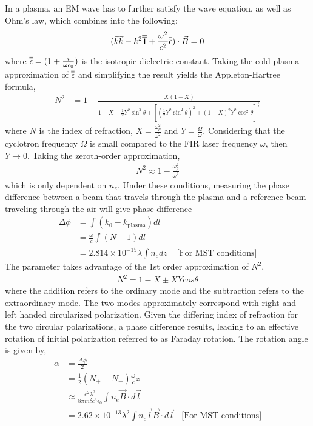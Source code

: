 In a plasma, an EM wave has to further satisfy the wave equation, as well as Ohm's law, which combines into the following:
\begin{align}
    (\vec{k}\vec{k} - k^2\overline{\overline{\textbf{1}}} + \frac{\omega^2}{c^2}\overline{\overline{\epsilon}})\cdot\vec{B} = 0
\end{align}
where $\overline{\overline{\epsilon}} = (1+\frac{i}{\omega\epsilon_0})$ is the isotropic dielectric constant. Taking the cold plasma approximation of $\overline{\overline{\epsilon}}$ and simplifying the result yields the Appleton-Hartree formula\cite{hutchinson_2002},
\begin{align}
    N^2 &= 1 - \frac{X(1-X)}{1-X-\frac{1}{2}Y^2 \sin^2\theta\pm [(\frac{1}{2}Y^2\sin^2\theta)^2 + (1-X)^2Y^2\cos^2\theta]^{\frac{1}{2}}}
\end{align}
where $N$ is the index of refraction, $X = \frac{\omega_p^2}{\omega^2}$ and $Y = \frac{\Omega}{\omega}$. Considering that the cyclotron frequency $\Omega$ is small compared to the FIR laser frequency $\omega$, then $Y \rightarrow 0$. Taking the zeroth-order approximation\cite{Hutchinson_2002},
\begin{align}
N^2 \approx 1 - \frac{\omega_p^2}{\omega^2}
\end{align}
which is only dependent on $n_e$. Under these conditions, measuring the phase difference between a beam that travels through the plasma and a reference beam traveling through the air will give phase difference
\begin{align}
    \Delta\phi &= \int(k_0 - k_{\text{plasma}})dl \nonumber\\
    &= \frac{\omega}{c}\int(N - 1)dl \nonumber \\
    &= 2.814\times10^{-15}\lambda\int n_e dz 
    &\text{\ [For MST conditions]}
\end{align}
The parameter takes advantage of the 1st order approximation of $N^2$,
\begin{align}
    N^2 = 1 - X \pm XY cos \theta
\end{align}
where the addition refers to the ordinary mode and the subtraction refers to the extraordinary mode. The two modes approximately correspond with right and left handed circularized polarization. Given the differing index of refraction for the two circular polarizations, a phase difference results, leading to an effective rotation of initial polarization referred to as Faraday rotation. The rotation angle is given by,
\begin{align}
    \alpha &= \frac{\Delta \phi}{2}\nonumber\\
    &= \frac{1}{2}(N_+ - N_-)\frac{\omega}{c}z \\
    &\approx \frac{e^2 \lambda^2}{8\pi m^2_e c^3 \epsilon_0}\int n_e \vec{B}\cdot d\vec{l} \nonumber \\
    &= 2.62\times10^{-13}\lambda^2\int n_e{\vec{l}}\vec{B}\cdot d\vec{l} &\text{[For MST conditions]}
\end{align}


